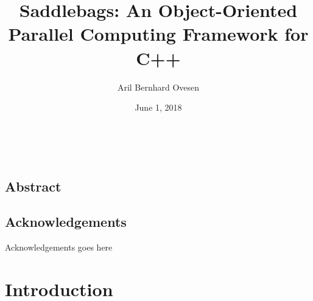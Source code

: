 \documentclass{uit-report}
\begin{document}

\title{Saddlebags: An Object-Oriented Parallel Computing Framework for C++}
\author{Aril Bernhard Ovesen}
\date{June 1, 2018}


\newpage\
\pagestyle{empty}

\mbox{}

\pagebreak
{}
\pagestyle{firststyle}
\section*{Abstract}
\lipsum[1]



\newpage
\section*{Acknowledgements}

Acknowledgements goes here \lipsum[1]


\newpage
\tableofcontents
\pagebreak
\listoffigures
\pagebreak
\listoftables
\pagebreak

\newpage
{}
\pagestyle{secondstyle}
\setcounter{page}{1}



\chapter{Introduction}




\end{document}
